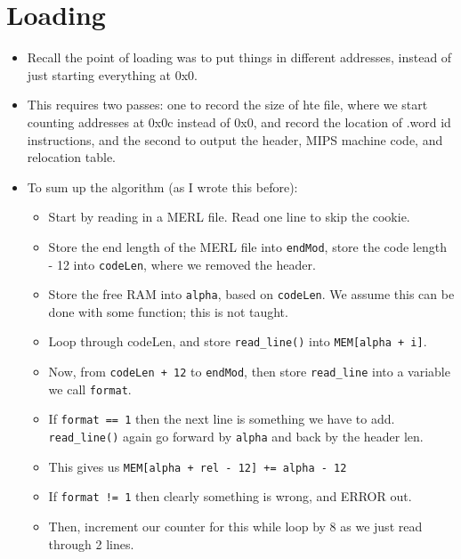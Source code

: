 \documentclass[12pt]{article}
\begin{document}
\section{Loading}
\begin{itemize}
    \item Recall the point of loading was to put things in different addresses, instead of just starting everything at 0x0.
    \item This requires two passes: one to record the size of hte file, where we start counting addresses at 0x0c instead of 0x0, and record the location of .word id instructions, and the second to output the header, MIPS machine code, and relocation table.
    \item To sum up the algorithm (as I wrote this before):
        \begin{itemize}
            \item Start by reading in a MERL file.  Read one line to skip the cookie.
            \item Store the end length of the MERL file into \lstinline[mathescape]{endMod}, store the code length - 12 into \lstinline[mathescape]{codeLen}, where we removed the header.
            \item Store the free RAM into \lstinline[mathescape]{alpha}, based on \lstinline[mathescape]{codeLen}.  We assume this can be done with some function; this is not taught.
            \item Loop through codeLen, and store \lstinline[mathescape]{read_line()} into \lstinline[mathescape]{MEM[alpha + i]}.
            \item Now, from \lstinline[mathescape]{codeLen + 12} to \lstinline[mathescape]{endMod}, then store \lstinline[mathescape]{read_line} into a variable we call \lstinline[mathescape]{format}.
            \item If \lstinline[mathescape]{format == 1} then the next line is something we have to add.  \lstinline[mathescape]{read_line()} again go forward by \lstinline[mathescape]{alpha} and back by the header len.
            \item This gives us \lstinline[mathescape]{MEM[alpha + rel - 12] += alpha - 12}
            \item If \lstinline[mathescape]{format != 1} then clearly something is wrong, and ERROR out.
            \item Then, increment our counter for this while loop by 8 as we just read through 2 lines.
        \end{itemize}
\end{itemize}
\end{document}
